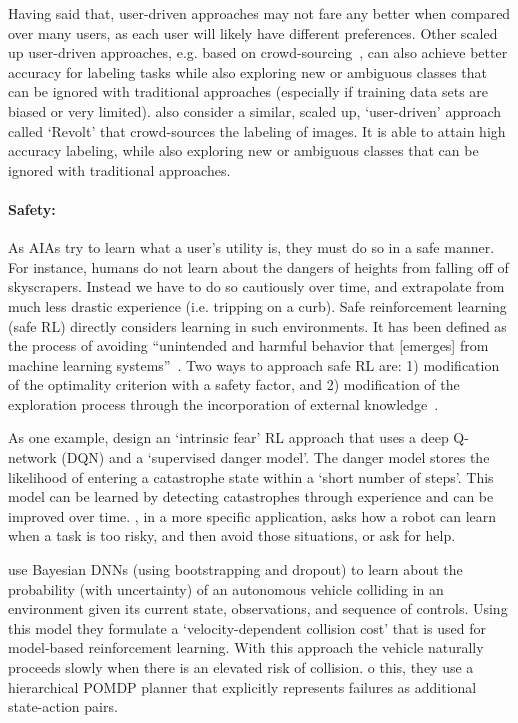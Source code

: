 Having said that, user-driven approaches may not fare any better when compared over many users, as each user will likely have different preferences. Other scaled up user-driven approaches, e.g. based on crowd-sourcing~\citet{Chang2017-kl}, can also achieve better accuracy for labeling tasks while also exploring new or ambiguous classes that can be ignored with traditional approaches (especially if training data sets are biased or very limited). \citet{Chang2017-kl} also consider a similar, scaled up, `user-driven' approach called `Revolt' that crowd-sources the labeling of images. It is able to attain high accuracy labeling, while also exploring new or ambiguous classes that can be ignored with traditional approaches.

\paragraph{Safety:}
As AIAs try to learn what a user's utility is, they must do so in a safe manner. For instance, humans do not learn about the dangers of heights from falling off of skyscrapers. Instead we have to do so cautiously over time, and extrapolate from much less drastic experience (i.e. tripping on a curb). Safe reinforcement learning (safe RL) directly considers learning in such environments. It has been defined as the process of avoiding ``unintended and harmful behavior that [emerges] from machine learning systems''~\cite{Amodei2016-xi}. Two ways to approach safe RL are: 1) modification of the optimality criterion with a safety factor, and 2) modification of the exploration process through the incorporation of external knowledge~\cite{Garcia2015-rs}.

As one example, \citet{Lipton2016-dq} design an `intrinsic fear' RL approach that uses a deep Q-network (DQN) and a `supervised danger model'. The danger model stores the likelihood of entering a catastrophe state within a `short number of steps'. This model can be learned by detecting catastrophes through experience and can be improved over time. \citet{Curran2016-ij}, in a more specific application, asks how a robot can learn when a task is too risky, and then avoid those situations, or ask for help.

\citet{Kahn2017-vy} use Bayesian DNNs (using bootstrapping and dropout) to learn about the probability (with uncertainty) of an autonomous vehicle colliding in an environment given its current state, observations, and sequence of controls. Using this model they formulate a `velocity-dependent collision cost' that is used for model-based reinforcement learning. With this approach the vehicle naturally proceeds slowly when there is an elevated risk of collision. o this, they use a hierarchical POMDP planner that explicitly represents failures as additional state-action pairs.

